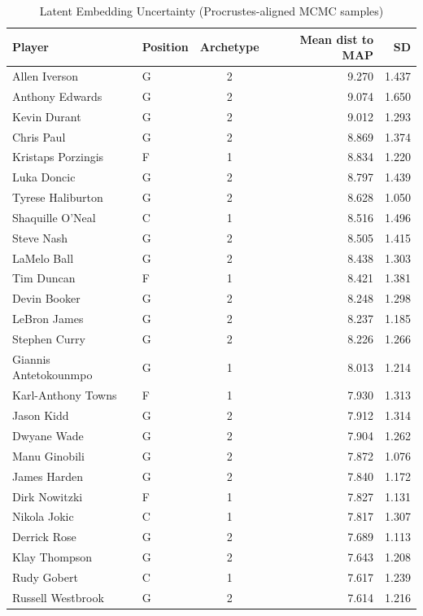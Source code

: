\begin{table}[t]
\caption*{
{\fontsize{20}{25}\selectfont  Latent Embedding Uncertainty (Procrustes-aligned MCMC samples)\fontsize{12}{15}\selectfont }
} 
\fontsize{12.0pt}{14.0pt}\selectfont
\begin{tabular*}{\linewidth}{@{\extracolsep{\fill}}llcrr}
\toprule
Player & Position & Archetype & Mean dist to MAP & SD \\ 
\midrule\addlinespace[2.5pt]
Allen Iverson & G & 2 & 9.270 & 1.437 \\ 
Anthony Edwards & G & 2 & 9.074 & 1.650 \\ 
Kevin Durant & G & 2 & 9.012 & 1.293 \\ 
Chris Paul & G & 2 & 8.869 & 1.374 \\ 
Kristaps Porzingis & F & 1 & 8.834 & 1.220 \\ 
Luka Doncic & G & 2 & 8.797 & 1.439 \\ 
Tyrese Haliburton & G & 2 & 8.628 & 1.050 \\ 
Shaquille O'Neal & C & 1 & 8.516 & 1.496 \\ 
Steve Nash & G & 2 & 8.505 & 1.415 \\ 
LaMelo Ball & G & 2 & 8.438 & 1.303 \\ 
Tim Duncan & F & 1 & 8.421 & 1.381 \\ 
Devin Booker & G & 2 & 8.248 & 1.298 \\ 
LeBron James & G & 2 & 8.237 & 1.185 \\ 
Stephen Curry & G & 2 & 8.226 & 1.266 \\ 
Giannis Antetokounmpo & G & 1 & 8.013 & 1.214 \\ 
Karl-Anthony Towns & F & 1 & 7.930 & 1.313 \\ 
Jason Kidd & G & 2 & 7.912 & 1.314 \\ 
Dwyane Wade & G & 2 & 7.904 & 1.262 \\ 
Manu Ginobili & G & 2 & 7.872 & 1.076 \\ 
James Harden & G & 2 & 7.840 & 1.172 \\ 
Dirk Nowitzki & F & 1 & 7.827 & 1.131 \\ 
Nikola Jokic & C & 1 & 7.817 & 1.307 \\ 
Derrick Rose & G & 2 & 7.689 & 1.113 \\ 
Klay Thompson & G & 2 & 7.643 & 1.208 \\ 
Rudy Gobert & C & 1 & 7.617 & 1.239 \\ 
Russell Westbrook & G & 2 & 7.614 & 1.216 \\ 

\end{tabular*}
\end{table}
